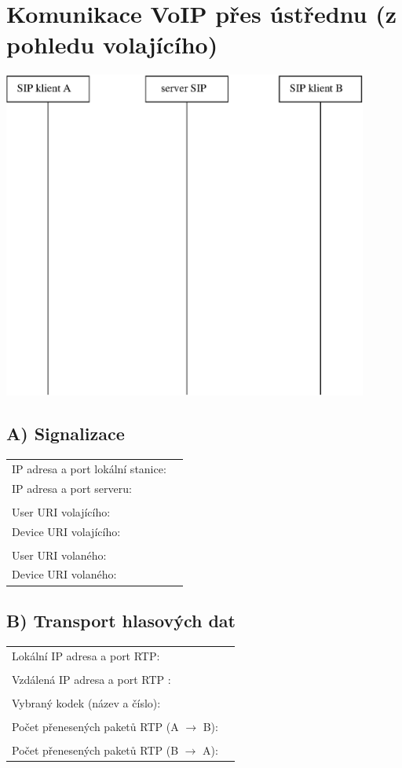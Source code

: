 \section{Komunikace VoIP přes ústřednu (z pohledu volajícího)}
  \begin{center}    
    \includegraphics[width=120mm]{pres-ustrednu.eps}
  \end{center}
  \vspace{1cm}

  \subsection*{A) Signalizace}
  \begin{tabular}{lp{2cm}}
    IP adresa a port lokální stanice: &\\
    IP adresa a port serveru: &\\
    &\\
    User URI volajícího: &\\
    Device URI volajícího: &\\
    &\\
    User URI volaného: &\\
    Device URI volaného: &\\
  \end{tabular}               

  \subsection*{B) Transport hlasových dat}
  \begin{tabular}{lp{2cm}}
    Lokální IP adresa a port RTP: &\\
    &\\
    Vzdálená IP adresa a port RTP : &\\
    &\\
    Vybraný kodek (název a číslo): &\\
    &\\
    Počet přenesených paketů RTP (A $\rightarrow$ B): &\\
    &\\
    Počet přenesených paketů RTP (B $\rightarrow$ A): &\\
\end{tabular}               
